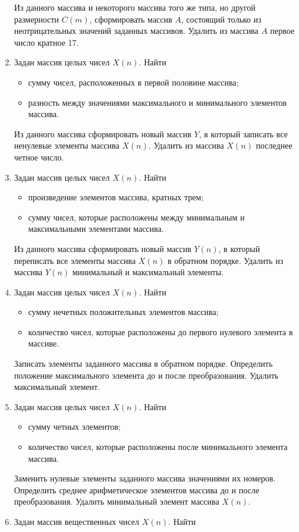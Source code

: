 \begin{enumerate}
Из данного массива и некоторого массива того же типа, но другой размерности $C(m)$,
сформировать массив $A$, состоящий только из неотрицательных значений заданных массивов. Удалить из
массива $A$ первое число кратное 17.
\item Задан массив целых чисел $X(n)$. Найти
\begin{itemize}
\item сумму чисел, расположенных в первой половине массива;
\item разность между значениями максимального и минимального элементов массива.
\end{itemize}
Из данного массива сформировать новый массив $Y$, в который записать все ненулевые элементы
массива $X(n)$. Удалить из массива $X(n)$ последнее четное число.
\item Задан массив целых чисел $X(n)$. Найти
\begin{itemize}
\item произведение элементов массива, кратных трем;
\item сумму чисел, которые расположены между минимальным и максимальными элементами массива.
\end{itemize}
Из данного массива сформировать новый массив $Y(n)$, в который переписать все элементы
массива $X(n)$ в обратном порядке. Удалить из массива $Y(n)$
минимальный и максимальный элементы.
\item Задан массив целых чисел $X(n)$. Найти
\begin{itemize}
\item сумму нечетных положительных элементов массива;
\item количество чисел, которые расположены до первого нулевого элемента в массиве.
\end{itemize}
Записать элементы заданного массива в обратном порядке. Определить положение максимального элемента до и после
преобразования. Удалить максимальный элемент.
\item Задан массив целых чисел $X(n)$. Найти
\begin{itemize}
\item сумму четных элементов;
\item количество чисел, которые расположены после минимального элемента массива.
\end{itemize}
Заменить нулевые элементы заданного массива значениями их номеров. Определить среднее арифметическое элементов
массива до и после преобразования. Удалить минимальный элемент массива $X(n)$.
\item Задан массив вещественных чисел $X(n)$. Найти

\end{enumerate}

